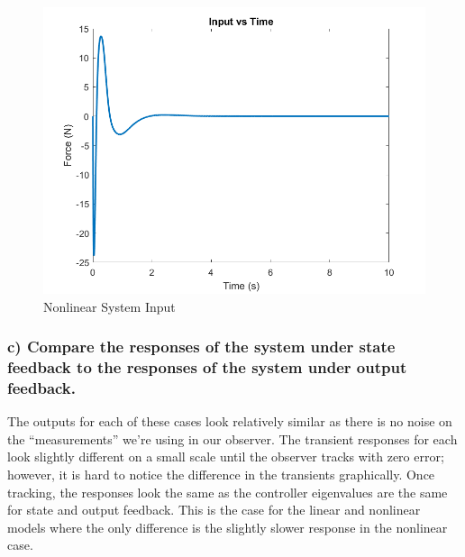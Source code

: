 \begin{figure}[!ht]
    \centering
    \includegraphics[width=\linewidth]{figs/of_nlin_input.png}
    \caption{Nonlinear System Input}
    \label{}
\end{figure}

\clearpage

\subsubsection*{c) Compare the responses of the system under state feedback to the responses of the system under
    output feedback. }

The outputs for each of these cases look relatively similar as there is no noise on the ``measurements” we’re using in our observer. The transient responses for each look slightly different on a small scale until the observer tracks with zero error; however, it is hard to notice the difference in the transients graphically. Once tracking, the responses look the same as the controller eigenvalues are the same for state and output feedback. This is the case for the linear and nonlinear models where the only difference is the slightly slower response in the nonlinear case.